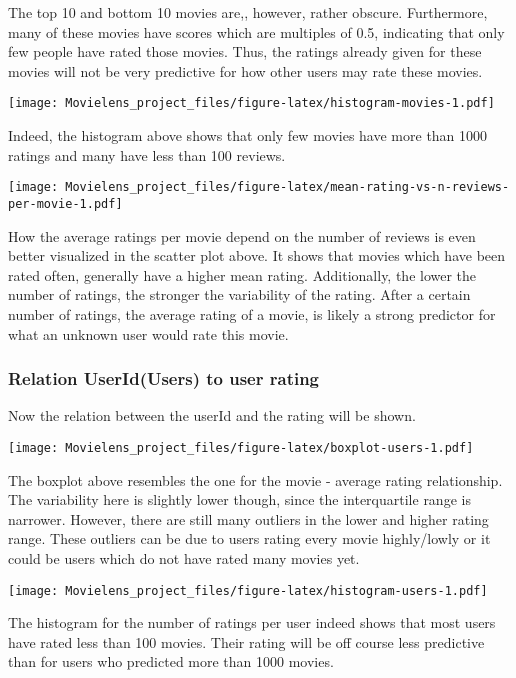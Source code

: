 \documentclass[
]{article}
\begin{document}
The top 10 and bottom 10 movies are,, however, rather obscure.
Furthermore, many of these movies have scores which are multiples of
0.5, indicating that only few people have rated those movies. Thus, the
ratings already given for these movies will not be very predictive for
how other users may rate these movies.

\texttt{[image: Movielens\_project\_files/figure-latex/histogram-movies-1.pdf]}

Indeed, the histogram above shows that only few movies have more than
1000 ratings and many have less than 100 reviews.

\texttt{[image: Movielens\_project\_files/figure-latex/mean-rating-vs-n-reviews-per-movie-1.pdf]}

How the average ratings per movie depend on the number of reviews is
even better visualized in the scatter plot above. It shows that movies
which have been rated often, generally have a higher mean rating.
Additionally, the lower the number of ratings, the stronger the
variability of the rating. After a certain number of ratings, the
average rating of a movie, is likely a strong predictor for what an
unknown user would rate this movie.

\hypertarget{relation-useridusers-to-user-rating}{%
\subsubsection{Relation UserId(Users) to user
rating}\label{relation-useridusers-to-user-rating}}

Now the relation between the userId and the rating will be shown.

\texttt{[image: Movielens\_project\_files/figure-latex/boxplot-users-1.pdf]}

The boxplot above resembles the one for the movie - average rating
relationship. The variability here is slightly lower though, since the
interquartile range is narrower. However, there are still many outliers
in the lower and higher rating range. These outliers can be due to users
rating every movie highly/lowly or it could be users which do not have
rated many movies yet.

\texttt{[image: Movielens\_project\_files/figure-latex/histogram-users-1.pdf]}

The histogram for the number of ratings per user indeed shows that most
users have rated less than 100 movies. Their rating will be off course
less predictive than for users who predicted more than 1000 movies.
\end{document}
